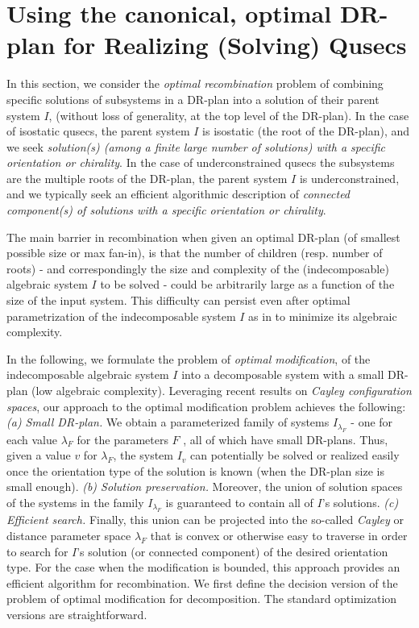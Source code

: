 \section{Using the canonical, optimal DR-plan for Realizing (Solving) Qusecs}
\label{sec:recomb}
In this section, we consider the {\em optimal recombination}
problem of combining specific solutions of
subsystems in a DR-plan into a solution of their parent system $I$, (without
loss of generality, at the top level of the DR-plan). In the case of isostatic
qusecs, the parent system $I$ is isostatic (the root of the DR-plan), and we
seek  {\em solution(s) (among a finite large number of solutions)
with a specific orientation or chirality}.
In the case of underconstrained qusecs the subsystems are the multiple roots
of the DR-plan, the parent system $I$ is underconstrained, and we typically seek
an efficient algorithmic description of {\em connected component(s) of solutions with a specific orientation or
chirality}.

The main barrier in recombination when given an optimal DR-plan (of smallest possible
size or max fan-in),  is that the number of children (resp. number of
roots) - and correspondingly the  size and complexity of the (indecomposable) algebraic
system $I$ to be solved -
could be arbitrarily large as a function of the size of the input system.
This difficulty can persist even after optimal parametrization of the
indecomposable system $I$ as in \cite{XX}
to minimize its algebraic complexity.

In the following, we formulate the problem of {\em optimal
modification},
of the indecomposable
algebraic system $I$ into a decomposable system with a small DR-plan (low
algebraic complexity).
Leveraging recent results on {\em Cayley
configuration spaces}, our approach to the optimal modification problem
achieves the following: {\em (a) Small DR-plan.} We obtain a  parameterized family of systems
$I_{\lambda_F}$ -  one for each value $\lambda_F$ for the parameters $F$ ,  all of which have
small DR-plans. Thus, given a value $v$ for $\lambda_F$, the system $I_v$ can
potentially be solved or realized easily once the orientation type of the solution
is known  (when the DR-plan size is small enough).
{\em (b) Solution preservation.} Moreover, the union of solution spaces of the systems in the family
$I_{\lambda_F}$
is guaranteed to contain
all of $I$'s solutions. {\em (c) Efficient search.} Finally, this union can be projected into the
so-called {\em Cayley} or distance parameter space $\lambda_F$ that is convex
or otherwise easy to traverse in order to search for $I$'s solution
(or connected component)
of the desired orientation type.
For the case when the modification is bounded, this approach provides an efficient
algorithm for recombination. We first define the decision version of the
problem of optimal modification
for decomposition. The standard optimization versions are straightforward.

